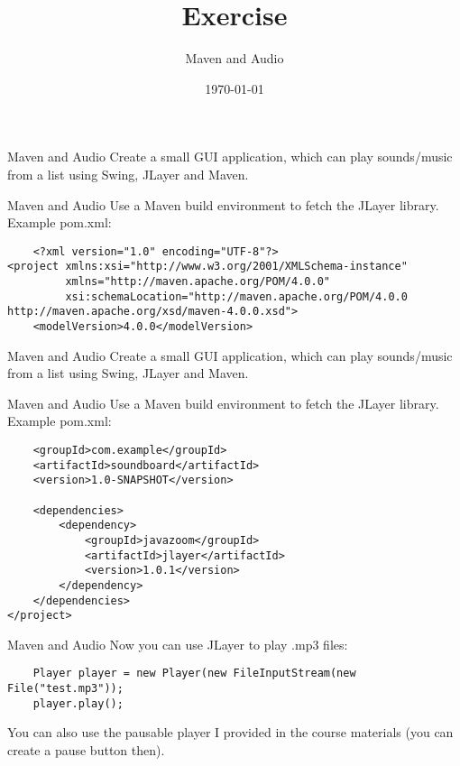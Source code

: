 


\title{Exercise}
\subtitle{Maven and Audio}
\date{\today}




\begin{frame}
    \titlepage
\end{frame}

\begin{frame}[fragile]{Maven and Audio}
    Create a small GUI application, which can play sounds/music from a list using Swing, JLayer and Maven.
\end{frame}

\begin{frame}{Maven and Audio}
    Use a Maven build environment to fetch the JLayer library. Example pom.xml:
    \begin{lstlisting}
    <?xml version="1.0" encoding="UTF-8"?>
<project xmlns:xsi="http://www.w3.org/2001/XMLSchema-instance"
         xmlns="http://maven.apache.org/POM/4.0.0"
         xsi:schemaLocation="http://maven.apache.org/POM/4.0.0 http://maven.apache.org/xsd/maven-4.0.0.xsd">
    <modelVersion>4.0.0</modelVersion>\end{lstlisting}
\end{frame}

\begin{frame}[fragile]{Maven and Audio}
    Create a small GUI application, which can play sounds/music from a list using Swing, JLayer and Maven.
\end{frame}

\begin{frame}{Maven and Audio}
    Use a Maven build environment to fetch the JLayer library. Example pom.xml:
    \begin{lstlisting}
    <groupId>com.example</groupId>
    <artifactId>soundboard</artifactId>
    <version>1.0-SNAPSHOT</version>

    <dependencies>
        <dependency>
            <groupId>javazoom</groupId>
            <artifactId>jlayer</artifactId>
            <version>1.0.1</version>
        </dependency>
    </dependencies>
</project>\end{lstlisting}
\end{frame}

\begin{frame}{Maven and Audio}
    Now you can use JLayer to play .mp3 files:
    \begin{lstlisting}
    Player player = new Player(new FileInputStream(new File("test.mp3"));
    player.play();
    \end{lstlisting}
    You can also use the pausable player I provided in the course materials (you can create a pause button then).
\end{frame}


